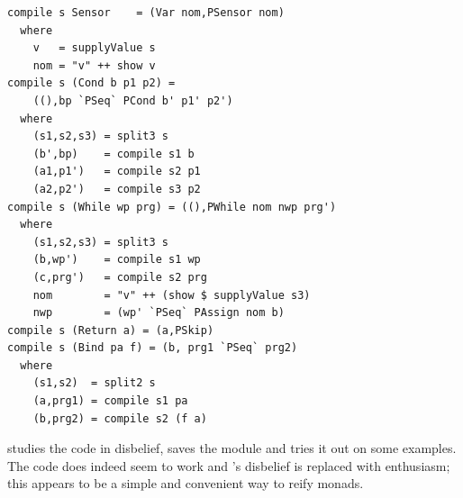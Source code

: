 \begin{small}
\begin{verbatim}
compile s Sensor    = (Var nom,PSensor nom)
  where
    v   = supplyValue s
    nom = "v" ++ show v 
compile s (Cond b p1 p2) = 
    ((),bp `PSeq` PCond b' p1' p2') 
  where
    (s1,s2,s3) = split3 s
    (b',bp)    = compile s1 b
    (a1,p1')   = compile s2 p1
    (a2,p2')   = compile s3 p2
compile s (While wp prg) = ((),PWhile nom nwp prg') 
  where
    (s1,s2,s3) = split3 s
    (b,wp')    = compile s1 wp
    (c,prg')   = compile s2 prg 
    nom        = "v" ++ (show $ supplyValue s3)
    nwp        = (wp' `PSeq` PAssign nom b) 
compile s (Return a) = (a,PSkip)
compile s (Bind pa f) = (b, prg1 `PSeq` prg2) 
  where
    (s1,s2)  = split2 s
    (a,prg1) = compile s1 pa
    (b,prg2) = compile s2 (f a) 
\end{verbatim}
\end{small}

%    

\docname{} studies the code in disbelief, saves the module and tries
it out on some examples. The code does indeed seem to work and
\docname{}'s disbelief is replaced with enthusiasm; this appears to be
a simple and convenient way to reify monads.

